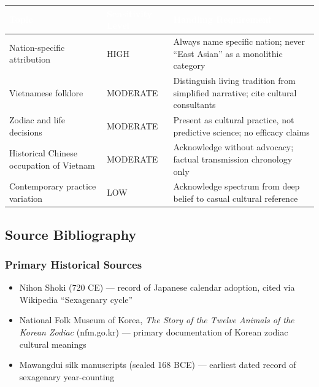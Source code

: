 \documentclass[11pt,letterpaper]{article}
\newcommand{\tableheader}[1]{\textbf{\sffamily\textcolor{white}{#1}}}
\begin{document}
\begin{center}
\begin{tabularx}{\textwidth}{L{3.5cm}L{3cm}X}
\toprule
{}
\tableheader{Topic} & \tableheader{Sensitivity Level} & \tableheader{Handling Requirement} \\
\midrule
Nation-specific attribution & HIGH & Always name specific nation; never ``East Asian'' as a monolithic category \\
Vietnamese folklore & MODERATE & Distinguish living tradition from simplified narrative; cite cultural consultants \\
Zodiac and life decisions & MODERATE & Present as cultural practice, not predictive science; no efficacy claims \\
Historical Chinese occupation of Vietnam & MODERATE & Acknowledge without advocacy; factual transmission chronology only \\
Contemporary practice variation & LOW & Acknowledge spectrum from deep belief to casual cultural reference \\
\bottomrule
\end{tabularx}
\end{center}

\subsection{Source Bibliography}

\subsubsection{Primary Historical Sources}
\begin{itemize}[leftmargin=2em]
  \item Nihon Shoki (720 CE) --- record of Japanese calendar adoption, cited via Wikipedia ``Sexagenary cycle''
  \item National Folk Museum of Korea, \textit{The Story of the Twelve Animals of the Korean Zodiac} (nfm.go.kr) --- primary documentation of Korean zodiac cultural meanings
  \item Mawangdui silk manuscripts (sealed 168 BCE) --- earliest dated record of sexagenary year-counting
\end{itemize}
\end{document}
